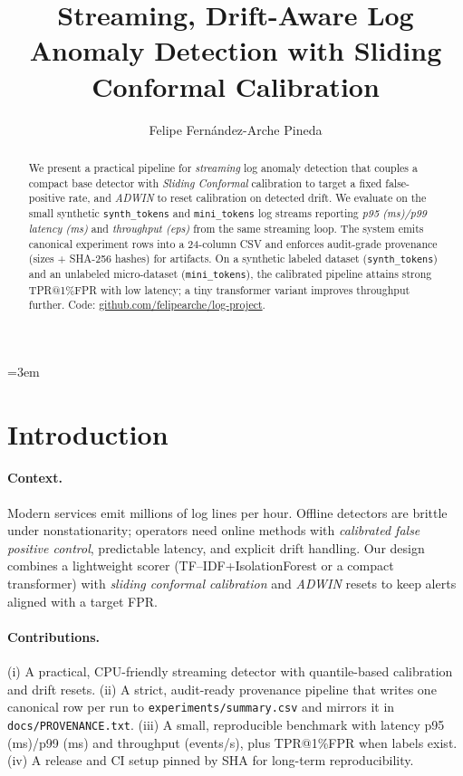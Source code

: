 \documentclass[10pt,twocolumn]{article}
\title{\large Streaming, Drift-Aware Log Anomaly Detection with Sliding Conformal Calibration}
\author{Felipe Fernández-Arche Pineda\\\small \texttt{\authoremail}}
\date{}
\begin{document}
\emergencystretch=3em

\raggedbottom

\maketitle

\begin{abstract}We present a practical pipeline for \emph{streaming} log anomaly detection that couples a compact base detector with \emph{Sliding Conformal} calibration to target a fixed false-positive rate, and \emph{ADWIN} to reset calibration on detected drift. We evaluate on the small synthetic \texttt{synth\_tokens} and \texttt{mini\_tokens} log streams reporting \emph{p95 (ms)/p99 latency (ms)} and \emph{throughput (eps)} from the same streaming loop. The system emits canonical experiment rows into a 24-column CSV and enforces audit-grade provenance (sizes + SHA-256 hashes) for artifacts. On a synthetic labeled dataset (\texttt{synth\_tokens}) and an unlabeled micro-dataset (\texttt{mini\_tokens}), the calibrated pipeline attains strong TPR@1\%FPR with low latency; a tiny transformer variant improves throughput further. Code: \href{https://github.com/felipearche/log-project}{github.com/felipearche/log-project}.\end{abstract}
\section{Introduction}
\paragraph{Context.} Modern services emit millions of log lines per hour. Offline detectors are brittle under nonstationarity; operators need online methods with \emph{calibrated false positive control}, predictable latency, and explicit drift handling. Our design combines a lightweight scorer (TF--IDF{+}IsolationForest or a compact transformer) with \emph{sliding conformal calibration} and \emph{ADWIN} resets to keep alerts aligned with a target FPR.
\paragraph{Contributions.} (i) A practical, CPU-friendly streaming detector with quantile-based calibration and drift resets. (ii) A strict, audit-ready provenance pipeline that writes one canonical row per run to \texttt{experiments/summary.csv} and mirrors it in \texttt{docs/PROVENANCE.txt}. (iii) A small, reproducible benchmark with latency p95 (ms)/p99 (ms) and throughput (events/s), plus TPR@1\%FPR when labels exist. (iv) A release and CI setup pinned by SHA for long-term reproducibility.
\end{document}
